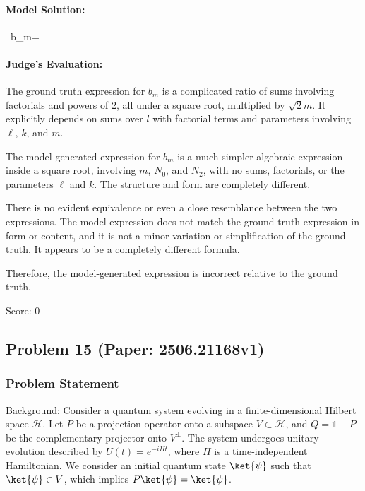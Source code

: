 \documentclass[10pt]{article}
\begin{document}
\paragraph*{Model Solution:}
\,%
b_{m}= 

\paragraph*{Judge's Evaluation:}

The ground truth expression for \( b_m \) is a complicated ratio of sums involving factorials and powers of 2, all under a square root, multiplied by \(\sqrt{2} m\). It explicitly depends on sums over \( l \) with factorial terms and parameters involving \(\ell\), \(k\), and \(m\).

The model-generated expression for \( b_m \) is a much simpler algebraic expression inside a square root, involving \( m \), \( N_0 \), and \( N_2 \), with no sums, factorials, or the parameters \(\ell\) and \(k\). The structure and form are completely different.

There is no evident equivalence or even a close resemblance between the two expressions. The model expression does not match the ground truth expression in form or content, and it is not a minor variation or simplification of the ground truth. It appears to be a completely different formula.

Therefore, the model-generated expression is incorrect relative to the ground truth.

Score: 0

\newpage
\subsection*{Problem 15 (Paper: 2506.21168v1)}
\subsubsection*{Problem Statement}
Background:
Consider a quantum system evolving in a finite-dimensional Hilbert space $\mathcal{H}$. Let $P$ be a projection operator onto a subspace $V \subset \mathcal{H}$, and $Q = \mathds{1} - P$ be the complementary projector onto $V^{\perp}$. The system undergoes unitary evolution described by $U(t) = e^{-iHt}$, where $H$ is a time-independent Hamiltonian. We consider an initial quantum state $\ket{\psi}$ such that $\ket{\psi} \in V$, which implies $P\ket{\psi} = \ket{\psi}$.
\end{document}
